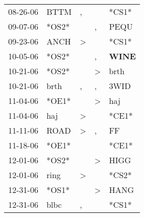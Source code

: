\begin{supertabular}{p{0.07\textwidth}p{0.06\textwidth}p{0.02\textwidth}p{0.02\textwidth}p{0.06\textwidth}}
          08-26-06\textsuperscript{} &           BTTM\textsuperscript{} &                , &                  &                            *CS1* \\
          09-07-06\textsuperscript{} &                            *OS2* &                  &                , &           PEQU\textsuperscript{} \\
          09-23-06\textsuperscript{} &           ANCH\textsuperscript{} &     \textgreater &                  &                            *CS1* \\
          10-05-06\textsuperscript{} &                            *OS2* &                  &                , &  \textbf{WINE\textsuperscript{}} \\
          10-21-06\textsuperscript{} &                            *OS2* &                  &     \textgreater &           brth\textsuperscript{} \\
          10-21-06\textsuperscript{} &           brth\textsuperscript{} &                , &                , &           3WID\textsuperscript{} \\
          11-04-06\textsuperscript{} &                            *OE1* &                  &     \textgreater &            haj\textsuperscript{} \\
          11-04-06\textsuperscript{} &            haj\textsuperscript{} &     \textgreater &                  &                            *CE1* \\
          11-11-06\textsuperscript{} &           ROAD\textsuperscript{} &     \textgreater &                , &             FF\textsuperscript{} \\
          11-18-06\textsuperscript{} &                            *OE1* &                  &                  &                            *CE1* \\
          12-01-06\textsuperscript{} &                            *OS2* &                  &     \textgreater &           HIGG\textsuperscript{} \\
          12-01-06\textsuperscript{} &           ring\textsuperscript{} &     \textgreater &                  &                            *CS2* \\
          12-31-06\textsuperscript{} &                            *OS1* &                  &     \textgreater &           HANG\textsuperscript{} \\
          12-31-06\textsuperscript{} &           blbc\textsuperscript{} &                , &                  &                            *CS1* \\

\end{supertabular}
